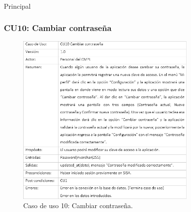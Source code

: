 \begin{UCtrayectoria}{Principal}
			\newpage
			
		\subsubsection{CU10: Cambiar contraseña}
			\begin{figure}[htbp!]
				\centering
					\includegraphics[width=0.8\textwidth]{images/CU/CU10}
					\caption{Caso de uso 10: Cambiar contraseña.}
				\label{Tabla}
			\end{figure}
			

\end{UCtrayectoria}
